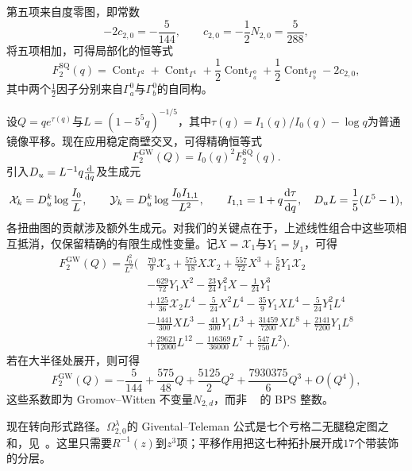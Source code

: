 \documentclass{amsart}
\theoremstyle{definition}
\theoremstyle{remark}
\theoremstyle{plain}
\theoremstyle{definition}
\theoremstyle{remark}
\newcommand{\mc}[1]{\mathcal{#1}}
\newcommand{\mr}[1]{\mathrm{#1}}
\newcommand{\1}{\mathbf{1}}
\newcommand{\2}{\mathbf{2}}
\newcommand{\3}{\mathbf{3}}
\DeclareMathOperator{\Cont}{Cont}
\begin{document}
第五项来自度零图，即常数
\[ -2c_{2,0} = -\frac{5}{144}, \qquad c_{2,0} = -\frac{1}{2}N_{2,0} = \frac{5}{288}, \]
将五项相加，可得局部化的恒等式
\[ F_2^{\mr{SQ}}(q) = \Cont_{\Gamma^2} + \Cont_{\Gamma^1} + \frac{1}{2}\Cont_{\Gamma_a^0} + \frac{1}{2}\Cont_{\Gamma_b^0} - 2c_{2,0}, \]
其中两个\(\frac{1}{2}\)因子分别来自\(\Gamma_a^0\)与\(\Gamma_b^0\)的自同构。

设\(Q = qe^{\tau(q)}\)与\(L = (1-5^5q)^{-1/5}\)，其中\(\tau(q) = I_1(q)/I_0(q) - \log q\)为普通镜像平移。现在应用稳定商壁交叉，可得精确恒等式
\[ F_2^{\mr{GW}}(Q) = I_0(q)^2 F_2^{\mr{SQ}}(q). \]
引入\(D_u = L^{-1}q\odv{}{q}\)及生成元
\[ \mc{X}_k = D_u^k \log \frac{I_0}{L}, \qquad \mc{Y}_k = D_u^k \log \frac{I_0I_{1,1}}{L^2}, \qquad I_{1,1} = 1 + q \odv{\tau}{q}, \quad D_u L = \frac{1}{5}(L^5-1), \]
各扭曲图的贡献涉及额外生成元。对我们的关键点在于，上述线性组合中这些项相互抵消，仅保留精确的有限生成性变量。记\(X = \mc{X}_1\)与\(Y_1 = \mc{Y}_1\)，可得
\begin{align*}
    F^{\mr{GW}}_2(Q) = \frac{I_0^2}{L^2}\Big(&\frac{70}{9}\mc{X}_3 + \frac{575}{18}X\mc{X}_2 + \frac{557}{72}X^3 + \frac{5}{6}Y_1\mc{X}_2 \\
    &- \frac{629}{72}Y_1X^2 - \frac{23}{24}Y_1^2 X - \frac{1}{24}Y_1^3 \\
    &+ \frac{125}{36}\mc{X}_2 L^4 - \frac{5}{24}X^2L^4 - \frac{35}{9}Y_1XL^4 - \frac{5}{24}Y_1^2L^4 \\
    &- \frac{1441}{300}XL^3 - \frac{41}{300}Y_1L^3 + \frac{31459}{7200}XL^8 + \frac{2141}{7200}Y_1L^8 \\
    &+ \frac{29621}{12000}L^{12} - \frac{116369}{36000}L^7 + \frac{547}{750}L^2\Big).
\end{align*}
若在大半径处展开，则可得
\[ F_2^{\mr{GW}}(Q) = -\frac{5}{144} + \frac{575}{48}Q + \frac{5125}{2}Q^2 + \frac{7930375}{6}Q^3 + O(Q^4), \]
这些系数即为 Gromov--Witten 不变量\(N_{2,d}\)，而非 ~ 的 BPS 整数。

现在转向形式路径。\(\Omega^{\lambda}_{2,0}\)的 Givental--Teleman 公式是七个亏格二无腿稳定图之和，见~。这里只需要\(R^{-1}(z)\)到\(z^3\)项；平移作用把这七种拓扑展开成\(17\)个带装饰的分层。
\end{document}
